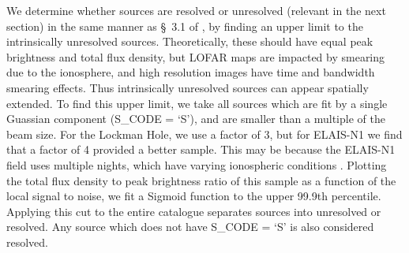\documentclass[usenatbib,fleqn,letters]{mnras}
\begin{document}
We determine whether sources are resolved or unresolved (relevant in the next section) in the same manner as \S~3.1 of \cite{shimwell_lofar_2019,shimwell_lofar_2022}, by finding an upper limit to the intrinsically unresolved sources. Theoretically, these should have equal peak brightness and total flux density, but LOFAR maps are impacted by smearing due to the ionosphere, and high resolution images have time and bandwidth smearing effects. Thus intrinsically unresolved sources can appear spatially extended. To find this upper limit, we take all sources which are fit by a single Guassian component ({\ttfamily S\_CODE = `S'}), and are smaller than a multiple of the beam size. For the Lockman Hole, we use a factor of 3, but for ELAIS-N1 we find that a factor of 4 provided a better sample. This may be because the ELAIS-N1 field uses multiple nights, which have varying ionospheric conditions \citep[see \S~2 in][]{de_jong_into_2024}. 
Plotting the total flux density to peak brightness ratio of this sample as a function of the local signal to noise, we fit a Sigmoid function to the upper 99.9th percentile. Applying this cut to the entire catalogue separates sources into unresolved or resolved. Any source which does not have {\ttfamily S\_CODE = `S'} is also considered resolved.
\end{document}
